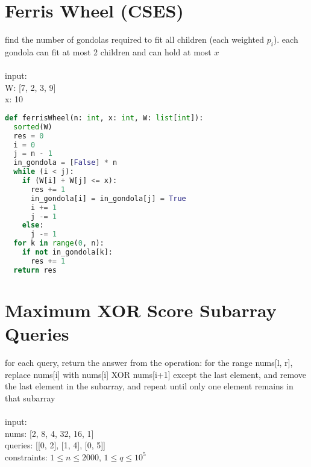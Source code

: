\documentclass[11pt]{article}
\begin{document}
\section{Ferris Wheel (CSES)}
find the number of gondolas required to fit all children (each weighted $p_{i}$). each gondola can fit at most 2 children and can hold at most $x$\\\;\\
input:\\
W: [7, 2, 3, 9]\\
x: 10
\begin{lstlisting}[language=Python]
def ferrisWheel(n: int, x: int, W: list[int]):
  sorted(W)
  res = 0
  i = 0
  j = n - 1
  in_gondola = [False] * n
  while (i < j):
    if (W[i] + W[j] <= x):
      res += 1
      in_gondola[i] = in_gondola[j] = True
      i += 1
      j -= 1
    else:
      j -= 1
  for k in range(0, n):
    if not in_gondola[k]:
      res += 1
  return res
\end{lstlisting} 


\section{Maximum XOR Score Subarray Queries}
for each query, return the answer from the operation: for the range nums[l, r], replace nums[i] with nums[i] XOR nums[i+1] except the last element, and remove the last element in the subarray, and repeat until only one element remains in that subarray\\\;\\
input:\\
nums: [2, 8, 4, 32, 16, 1]\\
queries: [[0, 2], [1, 4], [0, 5]]\\
constraints: $1 \leq n \leq 2000$, $1 \leq q \leq 10^{5}$
\end{document}

